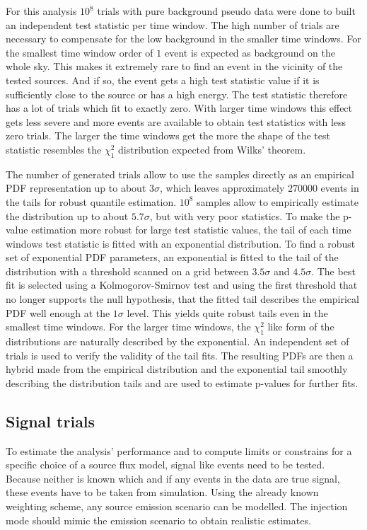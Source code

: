 For this analysis $10^8$ trials with pure background pseudo data were done to built an independent test statistic per time window.
The high number of trials are necessary to compensate for the low background in the smaller time windows.
For the smallest time window order of $1$ event is expected as background on the whole sky.
This makes it extremely rare to find an event in the vicinity of the tested sources.
And if so, the event gets a high test statistic value if it is sufficiently close to the source or has a high energy.
The test statistic therefore has a lot of trials which fit to exactly zero.
With larger time windows this effect gets less severe and more events are available to obtain test statistics with less zero trials.
The larger the time windows get the more the shape of the test statistic resembles the $\chi^2_1$ distribution expected from Wilks' theorem.

The number of generated trials allow to use the samples directly as an empirical PDF representation up to about $3\sigma$, which leaves approximately $\num{270000}$ events in the tails for robust quantile estimation.
$10^8$ samples allow to empirically estimate the distribution up to about $5.7\sigma$, but with very poor statistics.
To make the p-value estimation more robust for large test statistic values, the tail of each time windows test statistic is fitted with an exponential distribution.
To find a robust set of exponential PDF parameters, an exponential is fitted to the tail of the distribution with a threshold scanned on a grid between $3.5\sigma$ and $4.5\sigma$.
The best fit is selected using a Kolmogorov-Smirnov test  and using the first threshold that no longer supports the null hypothesis, that the fitted tail describes the empirical PDF well enough at the $1\sigma$ level.
This yields quite robust tails even in the smallest time windows.
For the larger time windows, the $\chi^2_1$ like form of the distributions are naturally described by the exponential.
An independent set of trials is used to verify the validity of the tail fits.
The resulting PDFs are then a hybrid made from the empirical distribution and the exponential tail smoothly describing the distribution tails and are used to estimate p-values for further fits.

\subsection*{Signal trials}
To estimate the analysis' performance and to compute limits or constrains for a specific choice of a source flux model, signal like events need to be tested.
Because neither is known which and if any events in the data are true signal, these events have to be taken from simulation.
Using the already known weighting scheme, any source emission scenario can be modelled.
The injection mode should mimic the emission scenario to obtain realistic estimates.

